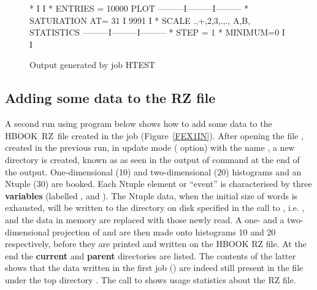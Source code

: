 \begin{figure}[p]
\begin{minipage}[t]{.495\textwidth}
\begin{XMPfrac}{3.3}
 *                                                          I         I
 * ENTRIES =    10000                   PLOT       ---------I---------I---------
 * SATURATION  AT=           31                             I 9991    I
 * SCALE  .,+,2,3,.,., A,B,           STATISTICS   ---------I---------I---------
 * STEP =    1     * MINIMUM=0                              I         I
\end{XMPfrac}
\end{minipage}
\caption{Output generated by job HTEST}
\label{FEX1OU}
\end{figure}
\clearpage

\subsection{Adding some data to the RZ file}

A second run using program  below shows
how to add some data to the HBOOK~RZ~file
created in the job  (Figure~\ref{FEX1IN}). 
After opening the file , created in the previous run,
in update mode ( option) with the
name , a new directory  is created,
known as  as seen in the output of
 command at the end of the output.
One-dimensional (10) and two-dimensional (20) histograms
and an Ntuple (30) are booked.
Each Ntuple element or ``event''
is characterised by three {\bf variables}
(labelled ,  and ).
The Ntuple data, when the initial size of 
words is exhausted, will be written to the directory on disk
specified in the
call to , i.e. ,
and the data in memory are replaced with those newly read.
A one- and a two-dimensional projection
of  and  are then made onto histograms
10 and 20 respectively, before they are printed and written on the
HBOOK RZ file. At the end the {\bf current} and {\bf parent}
directories are listed.
The contents of the latter shows that the data written in
the first job () are indeed still present in the file
under the top directory .
The call to  shows usage statistics about the RZ file.

